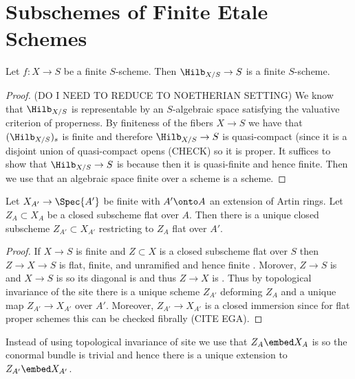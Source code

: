 \documentclass[12pt]{article}
\begin{document}
\section{Subschemes of Finite Etale Schemes}

\begin{prop}
Let $f : X \to S$ be a finite \etale $S$-scheme. Then $\Hilb_{X/S} \to S$ is a finite \etale $S$-scheme.
\end{prop}

\begin{proof}
(DO I NEED TO REDUCE TO NOETHERIAN SETTING)
We know that $\Hilb_{X/S}$ is representable by an $S$-algebraic space satisfying the valuative criterion of properness. By finiteness of the fibers $X \to S$ we have that $(\Hilb_{X/S})_s$ is finite and therefore $\Hilb_{X/S} \to S$ is quasi-compact (since it is a disjoint union of quasi-compact opens (CHECK) so it is proper. It suffices to show that $\Hilb_{X/S} \to S$ is \etale because then it is quasi-finite and hence finite. Then we use that an algebraic space finite over a scheme is a scheme. 
\end{proof}

\begin{prop}
Let $X_{A'} \to \Spec{A'}$ be finite \etale with $A' \onto A$ an extension of Artin rings. Let $Z_A \subset X_A$ be a closed subscheme flat over $A$. Then there is a unique closed subscheme $Z_{A'} \subset X_{A'}$ restricting to $Z_A$ flat over $A'$.
\end{prop}

\begin{proof}
If $X \to S$ is finite \etale and $Z \subset X$ is a closed subscheme flat over $S$ then $Z \to X \to S$ is flat, finite, and unramified and hence finite \etale. Morover, $Z \to S$ is \etale and $X \to S$ is \etale so its diagonal is \etale and thus $Z \to X$ is \etale. Thus by topological invariance of the \etale site there is a unique scheme $Z_{A'}$ deforming $Z_A$ and a unique map $Z_{A'} \to X_{A'}$ over $A'$.  Moreover, $Z_{A'} \to X_{A'}$ is a closed immersion since for flat proper schemes this can be checked fibrally (CITE EGA).  
\end{proof}

\begin{rmk}
Instead of using topological invariance of \etale site we use that $Z_A \embed X_A$ is \etale so the conormal bundle is trivial and hence there is a unique extension to $Z_{A'} \embed X_{A'}$.
\end{rmk}
\end{document}

